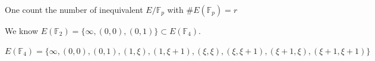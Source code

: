 \documentclass[handout]{beamer}%
\newcommand{\F}{\mathbb F}
\theoremstyle{definition}
\newtheorem{Note}[theorem]{\translate{Note}}
\begin{document}
\begin{frame}

\begin{block}
{One count the number of inequivalent $E/\F_p$ with $\#E(\F_p)=r$}
\end{block}\pause

\begin{example}[A curve over $\F_4=\F_2(\xi), \xi^2=\xi+1;\qquad E: y^2+y=x^3$]\pause
 We know $E(\F_2)=\{\infty, (0,0), (0,1)\}\subset E(\F_4).$\pause\\
 \begin{scriptsize}$E(\F_4)=\{\infty,(0,0),(0,1),(1,\xi),(1,\xi+1),(\xi,\xi),(\xi,\xi+1),
 (\xi+1,\xi),(\xi+1,\xi+1)\}$\end{scriptsize} \pause

\end{example}



\end{frame}
\end{document}
